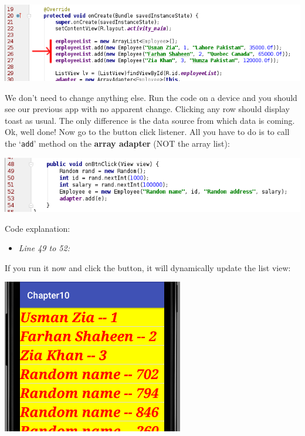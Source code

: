 \begin{center}
	\includegraphics[scale=0.4]{chapters/ch10/images/32}
\end{center}

We don't need to change anything else. Run the code on a device and you should see our previous app with no apparent change. Clicking any row should display toast as usual. The only difference is the data source from which data is coming. \\

Ok, well done! Now go to the button click listener. All you have to do is to call the `\texttt{add}' method on the \textbf{array adapter} (NOT the array list):

\begin{center}
	\includegraphics[scale=0.4]{chapters/ch10/images/33}
\end{center}

Code explanation:

\begin{itemize}
	\item \textit{Line 49 to 52:} 
\end{itemize}

If you run it now and click the button, it will dynamically update the list view:

\begin{center}
	\includegraphics[scale=0.4]{chapters/ch10/images/34}
\end{center}

